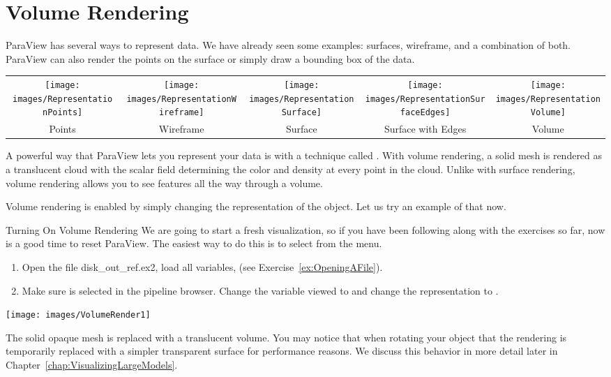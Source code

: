 \section{Volume Rendering}

ParaView has several ways to represent data.  We have already seen some
examples: surfaces, wireframe, and a combination of both.  ParaView can
also render the points on the surface or simply draw a bounding box of the
data.

\begin{inlinefig}
  \begin{tabular}{c@{\;}c@{\;}c@{\;}c@{\;}c}
    \texttt{[image: images/RepresentationPoints]} &
    \texttt{[image: images/RepresentationWireframe]} &
    \texttt{[image: images/RepresentationSurface]} &
    \texttt{[image: images/RepresentationSurfaceEdges]} &
    \texttt{[image: images/RepresentationVolume]}
    \\
    Points &
    Wireframe &
    Surface &
    \parbox[t]{.18\linewidth}{\centering{}Surface with Edges} &
    Volume
  \end{tabular}
\end{inlinefig}

A powerful way that ParaView lets you represent your data is with a
technique called .  With volume rendering, a
solid mesh is rendered as a translucent cloud with the scalar field
determining the color and density at every point in the cloud.  Unlike with
surface rendering, volume rendering allows you to see features all the way
through a volume.

Volume rendering is enabled by simply changing the representation of the
object.  Let us try an example of that now.

\begin{exercise}{Turning On Volume Rendering}
  \label{ex:VolumeRendering}%
  We are going to start a fresh visualization, so if you have been
  following along with the exercises so far, now is a good time to reset
  ParaView.  The easiest way to do this is to select  \ra
   from the menu.

  \begin{enumerate}
  \item Open the file disk\_out\_ref.ex2, load all variables, \apply (see
    Exercise~\ref{ex:OpeningAFile}).
  \item Make sure  is selected in the pipeline
    browser.  Change the variable viewed to  and change the
    representation to .
  \end{enumerate}

  \begin{inlinefig}
    \texttt{[image: images/VolumeRender1]}
  \end{inlinefig}

  The solid opaque mesh is replaced with a translucent volume. You may
  notice that when rotating your object that the rendering is temporarily
  replaced with a simpler transparent surface for performance reasons. We
  discuss this behavior in more detail later in
  Chapter~\ref{chap:VisualizingLargeModels}.
\end{exercise}

